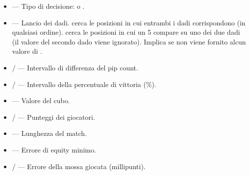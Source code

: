 \documentclass[letterpaper,10pt,italian]{sphinxmanual}
\begin{document}
\sphinxAtStartPar
{}
\begin{itemize}
\item {} 
\sphinxAtStartPar
{} — Tipo di decisione:  o .

\item {} 
\sphinxAtStartPar
{} — Lancio dei dadi.  cerca le posizioni in cui entrambi i dadi corrispondono (in qualsiasi ordine).  cerca le posizioni in cui un 5 compare su uno dei due dadi (il valore del secondo dado viene ignorato). Implica  se non viene fornito alcun valore di .

\item {} 
\sphinxAtStartPar
{} /  — Intervallo di differenza del pip count.

\item {} 
\sphinxAtStartPar
{} /  — Intervallo della percentuale di vittoria (\%).

\item {} 
\sphinxAtStartPar
{} — Valore del cubo.

\item {} 
\sphinxAtStartPar
{} /  — Punteggi dei giocatori.

\item {} 
\sphinxAtStartPar
{} — Lunghezza del match.

\item {} 
\sphinxAtStartPar
{} — Errore di equity minimo.

\item {} 
\sphinxAtStartPar
{} /  — Errore della mossa giocata (millipunti).


\end{itemize}
\end{document}

